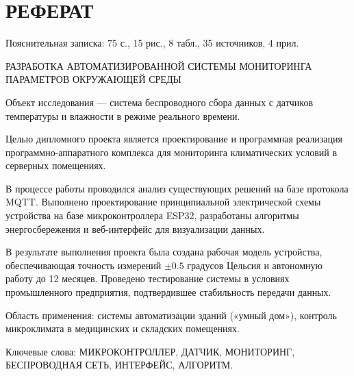 \chapter*{РЕФЕРАТ}

\noindent Пояснительная записка: 75 с., 15 рис., 8 табл., 35 источников, 4 прил.

\vspace{0.5cm}

\noindent \MakeUppercase{РАЗРАБОТКА АВТОМАТИЗИРОВАННОЙ СИСТЕМЫ МОНИТОРИНГА ПАРАМЕТРОВ ОКРУЖАЮЩЕЙ СРЕДЫ}

\vspace{0.8cm}


Объект исследования --- система беспроводного сбора данных с датчиков температуры и влажности в режиме реального времени.

Целью дипломного проекта является проектирование и программная реализация программно-аппаратного комплекса для мониторинга климатических условий в серверных помещениях.

В процессе работы проводился анализ существующих решений на базе протокола MQTT. Выполнено проектирование принципиальной электрической схемы устройства на базе микроконтроллера ESP32, разработаны алгоритмы энергосбережения и веб-интерфейс для визуализации данных.

В результате выполнения проекта была создана рабочая модель устройства, обеспечивающая точность измерений $\pm 0.5$ градусов Цельсия и автономную работу до 12 месяцев. Проведено тестирование системы в условиях промышленного предприятия, подтвердившее стабильность передачи данных.

Область применения: системы автоматизации зданий («умный дом»), контроль микроклимата в медицинских и складских помещениях.

\vspace{1cm}

\noindent Ключевые слова: МИКРОКОНТРОЛЛЕР, ДАТЧИК, МОНИТОРИНГ, БЕСПРОВОДНАЯ СЕТЬ, ИНТЕРФЕЙС, АЛГОРИТМ.

\newpage